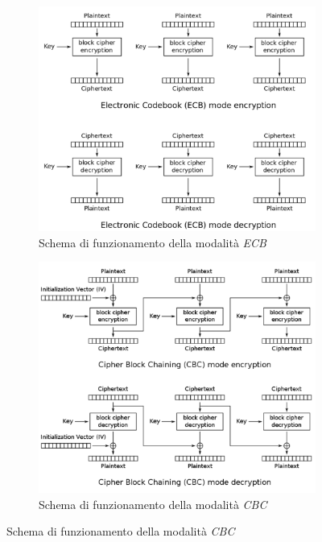 \begin{figure}[h]
    \begin{subfigure}{0.48\textwidth}
        \includegraphics[width=1\textwidth]{capitoli/figure-crittografia/aes-ecb.png}
        \caption{Schema di funzionamento della modalità \emph{ECB}}
        \label{fig:aes-ecb}
    \end{subfigure}
    \begin{subfigure}{0.48\textwidth}
        \includegraphics[width=1\textwidth]{capitoli/figure-crittografia/aes-cbc.png}
        \caption{Schema di funzionamento della modalità \emph{CBC}}

\end{subfigure}
\end{figure}
